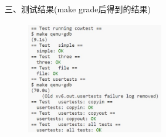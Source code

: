 \documentclass[12pt]{article}
\begin{document}
\begin{figure}[!h]
    \centering
    \hfill
\end{figure}


\begin{Large}
	\noindent 三、测试结果(make grade后得到的结果)
\end{Large}
\begin{figure}[H]
    \centering
    \includegraphics[height=5cm,width=6cm]{lab5-12.jpg}
\end{figure}
\end{document}
